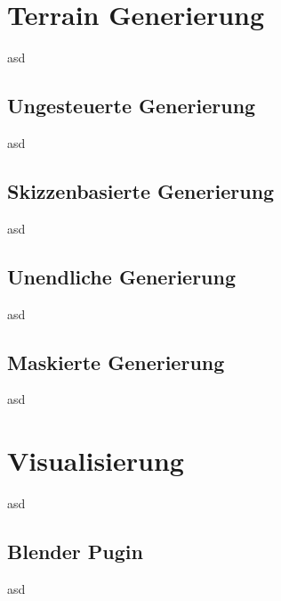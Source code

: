 \section {Terrain Generierung}

asd

\subsection {Ungesteuerte Generierung}

asd

\subsection {Skizzenbasierte Generierung}

asd

\subsection {Unendliche Generierung}

asd

\subsection {Maskierte Generierung}

asd


\section {Visualisierung}

asd

\subsection {Blender Pugin}

asd

